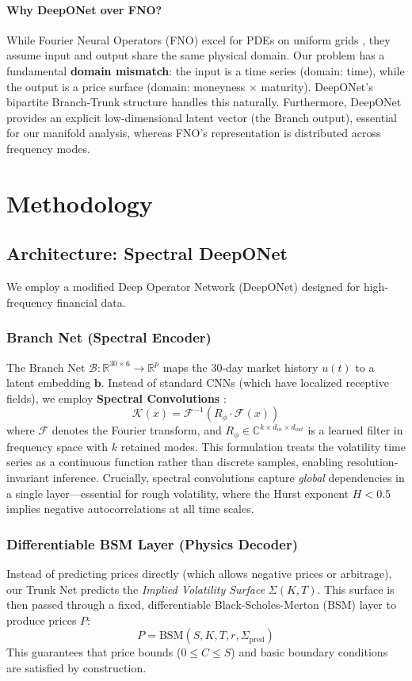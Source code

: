\documentclass{article}
\begin{document}
\paragraph{Why DeepONet over FNO?} While Fourier Neural Operators (FNO) excel for PDEs on uniform grids \citep{kovachki2021neuraloperator}, they assume input and output share the same physical domain. Our problem has a fundamental \textbf{domain mismatch}: the input is a time series (domain: time), while the output is a price surface (domain: moneyness \(\times\) maturity). DeepONet's bipartite Branch-Trunk structure handles this naturally. Furthermore, DeepONet provides an explicit low-dimensional latent vector (the Branch output), essential for our manifold analysis, whereas FNO's representation is distributed across frequency modes.

\section{Methodology}

\subsection{Architecture: Spectral DeepONet}
We employ a modified Deep Operator Network (DeepONet) \citep{Lu_2021} designed for high-frequency financial data.

\subsubsection{Branch Net (Spectral Encoder)}
The Branch Net \(\mathcal{B}: \mathbb{R}^{30 \times 6} \to \mathbb{R}^p\) maps the 30-day market history \(u(t)\) to a latent embedding \(\mathbf{b}\). Instead of standard CNNs (which have localized receptive fields), we employ \textbf{Spectral Convolutions} \citep{kovachki2021neuraloperator}:
\[
    \mathcal{K}(x) = \mathcal{F}^{-1}\left(R_\phi \cdot \mathcal{F}(x)\right)
\]
where \(\mathcal{F}\) denotes the Fourier transform, and \(R_\phi \in \mathbb{C}^{k \times d_{in} \times d_{out}}\) is a learned filter in frequency space with \(k\) retained modes. This formulation treats the volatility time series as a continuous function rather than discrete samples, enabling resolution-invariant inference. Crucially, spectral convolutions capture \emph{global} dependencies in a single layer---essential for rough volatility, where the Hurst exponent \(H < 0.5\) implies negative autocorrelations at all time scales.

\subsubsection{Differentiable BSM Layer (Physics Decoder)}
Instead of predicting prices directly (which allows negative prices or arbitrage), our Trunk Net predicts the \emph{Implied Volatility Surface} \(\Sigma(K, T)\). This surface is then passed through a fixed, differentiable Black-Scholes-Merton (BSM) layer to produce prices \(P\):
\[
    P = \text{BSM}(S, K, T, r, \Sigma_{\text{pred}})
\]
This guarantees that price bounds (\(0 \le C \le S\)) and basic boundary conditions are satisfied by construction.
\end{document}
